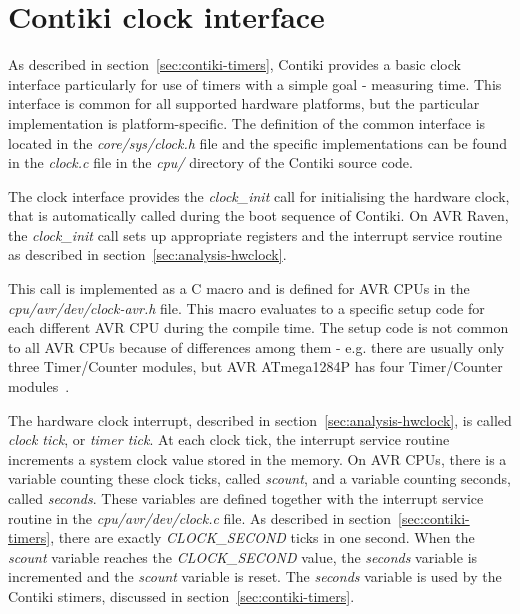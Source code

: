 
\section{Contiki clock interface}\label{sec:analysis-clock-interface}
As described in section~\ref{sec:contiki-timers},
Contiki provides a basic clock interface particularly for use of timers
with a simple goal - measuring time.
This interface is common for all supported hardware platforms,
but the particular implementation is platform-specific.
The definition of the common interface is located in the {\it{core/sys/clock.h}} file
and the specific implementations can be found in the {\it{clock.c}} file
in the {\it{cpu/}} directory of the Contiki source code.

The clock interface provides the {\it{clock\_init}} call for initialising the hardware clock,
that is automatically called during the boot sequence of Contiki.
On AVR Raven, the {\it{clock\_init}} call sets up
appropriate registers and the interrupt service routine as described in section~\ref{sec:analysis-hwclock}.

This call is implemented as a C macro and is defined for AVR CPUs in the {\it{cpu/avr/dev/clock-avr.h}} file.
This macro evaluates to a specific setup code for each different AVR CPU during the compile time.
The setup code is not common to all AVR CPUs because of differences among them - e.g. there are usually
only three Timer/Counter modules, but AVR ATmega1284P has four Timer/Counter modules~\cite{avr-datasheet}.

The hardware clock interrupt, described in section~\ref{sec:analysis-hwclock},
is called {\it{clock tick}}, or {\it{timer tick}}.
At each clock tick, the interrupt service routine increments
a system clock value stored in the memory.
On AVR CPUs, there is a variable counting these clock ticks, called {\it{scount}},
and a variable counting seconds, called {\it{seconds}}.
These variables are defined together with the interrupt service routine in the {\it{cpu/avr/dev/clock.c}} file.
As described in section~\ref{sec:contiki-timers}, there are exactly {\it{CLOCK\_SECOND}} ticks in one second.
When the {\it{scount}} variable reaches the {\it{CLOCK\_SECOND}} value,
the {\it{seconds}} variable is incremented and the {\it{scount}} variable is reset.
The {\it{seconds}} variable is used by the Contiki stimers, discussed in section~\ref{sec:contiki-timers}.

